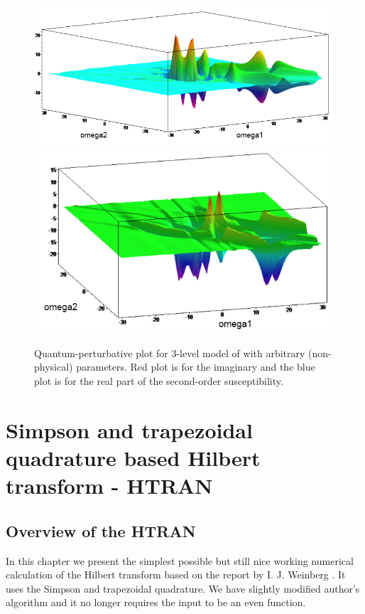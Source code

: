 \documentclass[12pt,twoside,a4paper]{article}
\numberwithin{equation}{subsection}
\numberwithin{figure}{subsection}
\begin{document}
\begin{figure} 
  \includegraphics[width=150mm]{img/qp_3da.png} \\
  \includegraphics[width=150mm]{img/qp_3db.png}
  \caption{Quantum-perturbative plot for 3-level model of with arbitrary (non-physical) parameters. Red plot is for the imaginary
  and the blue plot is for the real part of the second-order susceptibility.
  \label{fig:qp_3d}}
\end{figure}
   
\section{Simpson and trapezoidal quadrature based Hilbert transform - HTRAN} \label{chap:htran}

\subsection{Overview of the HTRAN} \label{chap:htran_overview}

In this chapter we present the simplest possible but still nice working numerical calculation of the Hilbert transform based on the report
by I. J. Weinberg \cite{weinberg_hilbert}. It uses the Simpson and trapezoidal quadrature. We have slightly modified author's algorithm and
it no longer requires the input to be an even function.
\end{document}
